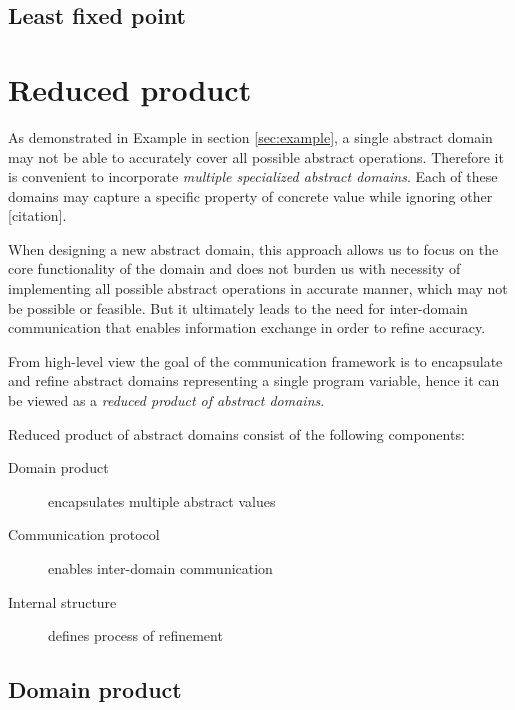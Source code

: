 \documentclass[12pt,oneside,draft]{fithesis2}
\begin{document}
\section{Least fixed point}\label{sec:fixed-point}

\cite{CousotCousot79-1}

\chapter{Reduced product}

As demonstrated in Example in section \ref{sec:example}, a single abstract domain may not be able to accurately cover all possible abstract operations. Therefore it is convenient to incorporate \textit{multiple specialized abstract domains}. Each of these domains may capture a specific property of concrete value while ignoring other [citation].

When designing a new abstract domain, this approach allows us to focus on the core functionality of the domain and does not burden us with necessity of implementing all possible abstract operations in accurate manner, which may not be possible or feasible. But it ultimately leads to the need for inter-domain communication that enables information exchange in order to refine accuracy.

From high-level view the goal of the communication framework is to encapsulate and refine abstract domains representing a single program variable, hence it can be viewed as a \textit{reduced product of abstract domains}.

Reduced product of abstract domains consist of the following components:

\begin{description}
  \item[Domain product] encapsulates multiple abstract values
  \item[Communication protocol] enables inter-domain communication
  \item[Internal structure] defines process of refinement
\end{description}

\section{Domain product}\label{sec:domain-product}
\end{document}

